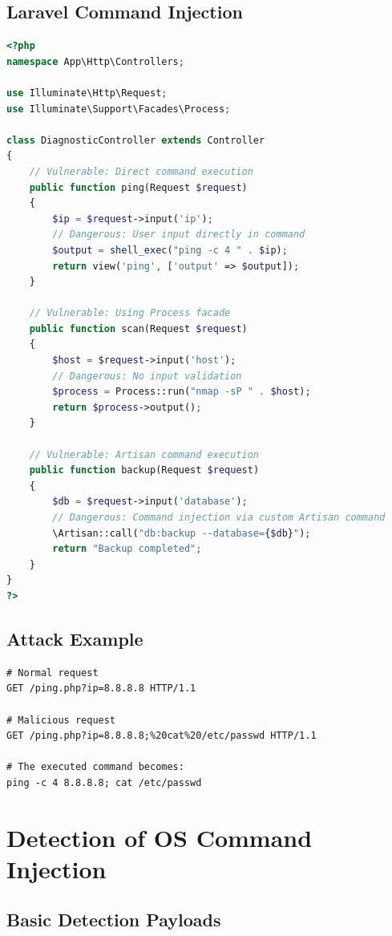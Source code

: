 \documentclass[12pt]{article}
\begin{document}
\subsection{Laravel Command Injection}

\begin{lstlisting}[language=PHP, caption=Vulnerable Laravel Code]
<?php
namespace App\Http\Controllers;

use Illuminate\Http\Request;
use Illuminate\Support\Facades\Process;

class DiagnosticController extends Controller
{
    // Vulnerable: Direct command execution
    public function ping(Request $request)
    {
        $ip = $request->input('ip');
        // Dangerous: User input directly in command
        $output = shell_exec("ping -c 4 " . $ip);
        return view('ping', ['output' => $output]);
    }
    
    // Vulnerable: Using Process facade
    public function scan(Request $request)
    {
        $host = $request->input('host');
        // Dangerous: No input validation
        $process = Process::run("nmap -sP " . $host);
        return $process->output();
    }
    
    // Vulnerable: Artisan command execution
    public function backup(Request $request)
    {
        $db = $request->input('database');
        // Dangerous: Command injection via custom Artisan command
        \Artisan::call("db:backup --database={$db}");
        return "Backup completed";
    }
}
?>
\end{lstlisting}

\subsection{Attack Example}

\begin{lstlisting}
# Normal request
GET /ping.php?ip=8.8.8.8 HTTP/1.1

# Malicious request
GET /ping.php?ip=8.8.8.8;%20cat%20/etc/passwd HTTP/1.1

# The executed command becomes:
ping -c 4 8.8.8.8; cat /etc/passwd
\end{lstlisting}

\section{Detection of OS Command Injection}

\subsection{Basic Detection Payloads}
\end{document}
